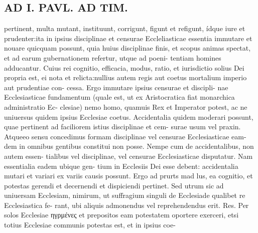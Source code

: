 \documentclass{article}
\begin{document}
\begin{pages}
\section*{AD I. PAVL. AD TIM. }
\marginpar{[ p.244 ]}pertinent, multa mutant, instituunt, corrigunt, figunt et refigunt, ídque iure et prudenter:ita in ipsius disciplinae et censurae Eccleliasticae essentia immutare et nouare quicquam possunt, quia huius disciplinae finis, et scopus animas spectat, et ad earum gubernationem refertur, utque ad poeni- tentiam homines adducantur. Cuius rei cognitio, efficacia, modus, ratio, et iurisdictio solius Dei propria est, ei nota et relicta:nullius autem regis aut coetus mortalium imperio aut prudentiae con- cessa. Ergo immutare ipsius censurae et discipli- nae Ecclesiasticae fundamentum (quale est, ut ex Aristocratica fiat monarchica administratio Ec- clesiae) nemo homo, quamuis Rex et Imperator potest, ac ne uniuersus quidem ipsius Ecclesiae coetus. Accidentalia quidem moderari possunt, quae pertinent ad faciliorem istius disciplinae et cem- surae usum vel praxin. Atqueeo sensu concedimus formam disciplinae vel censurae Ecclesiasticae eam- dem in omnibus gentibus constitui non posse. Nempe cum de accidentalibus, non autem essen- tialibus vel disciplinae, vel censurae Ecclesiasticae disputatur. Nam essentialia eadem ubique gen- tium in Ecclesiis Dei esse debent: accidentalia mutari et variari ex variis causis possunt. Ergo ad prurts mad lus, ea cognitio, et potestas gerendi et decernendi et dispiciendi pertinet. Sed utrum sic ad uniuersam Ecclesiam, nimirum, ut suffragium singuli de Ecclesiade qualibet re Ecclesiastica fe- rant, ubi aliquis admonendus vel reprehendendus erit. Res. Per solos Ecclesiae ηγρμένες et prepositos eam potestatem oportere exerceri, etsi totius Ecclesiae communis potestas est, et in ipsius coe- 

\end{pages}
\end{document}
